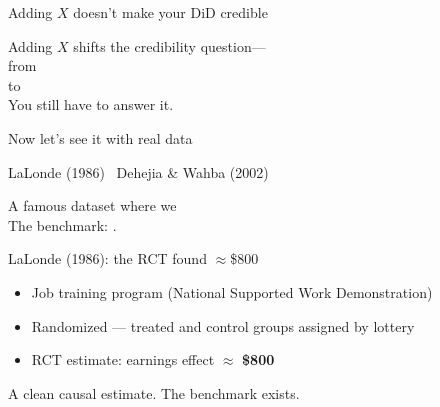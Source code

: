 \documentclass[aspectratio=169,11pt]{beamer}
\begin{document}

\begin{frame}{Adding $X$ doesn't make your DiD credible}
\vspace{1.0em}
\begin{center}
\large
Adding $X$ shifts the credibility question---\\[0.6em]
from \\[0.5em]
to \\[0.8em]
\color{warmgray}\normalsize
You still have to answer it.
\end{center}
\end{frame}


\begin{frame}{Now let's see it with real data}
\vspace{1.2em}
\begin{center}
\Large
LaLonde (1986) \textperiodcentered\ Dehejia \& Wahba (2002)
\end{center}
\vspace{0.8em}
\begin{center}
\color{warmgray}
A famous dataset where we \\[0.4em]
The benchmark: .
\end{center}
\end{frame}

\begin{frame}{LaLonde (1986): the RCT found $\approx$\$800}
\vspace{0.8em}
\begin{itemize}\setlength\itemsep{0.6em}
  \item Job training program (National Supported Work Demonstration)
  \item Randomized --- treated and control groups assigned by lottery
  \item RCT estimate: earnings effect $\approx$ \textbf{\$800}
\end{itemize}
\vspace{0.6em}
\begin{center}\color{warmgray}\small
A clean causal estimate. The benchmark exists.
\end{center}
\end{frame}
\end{document}
